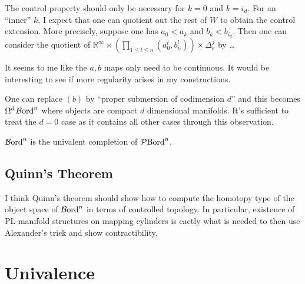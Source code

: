 \documentclass{article}
\begin{document}
\begin{remark}
    The control property should only be necessary for $k = 0$ and $k = i_d$.
    For an ``inner'' $k$, I expect that one can quotient out the rest of $W$ to obtain the control extension. 
    More precisely, suppose one has $a_0 < a_k$ and $b_k < b_{i_d}$.
    Then one can consider the quotient of $\mathbb{R}^\infty \times \left(\prod_{1 \leq l \leq n} (a^l_0, b^l_{i_l})\right) \underline{\times} \Delta^j_e$ by \ldots
\end{remark}

\begin{remark}
    It seems to me like the $a,b$ maps only need to be continuous.
    It would be interesting to see if more regularity arises in my constructions.
\end{remark}

\begin{remark}[Looping]
    One can replace $(b)$ by ``proper submersion of codimension $d$'' and this becomes $\Omega^d \operatorname{\mathcal{B}ord}^n$ where objects are compact $d$ dimensional manifolds.
    It's sufficient to treat the $d=0$ case as it contains all other cases through this observation.
\end{remark}

\begin{theorem}\label{thm:main}
    $\operatorname{\mathcal{B}ord}^n$ is the univalent completion of $\operatorname{\mathcal{P}Bord}^n$.
\end{theorem}

\subsection{Quinn's Theorem}

I think Quinn's theorem should show how to compute the homotopy type of the object space of $\operatorname{\mathcal{B}ord}^n$ in terms of controlled topology.
In particular, existence of PL-manifold structures on mapping cylinders is eactly what is needed to then use Alexander's trick and show contractibility.

\section{Univalence}
\end{document}
